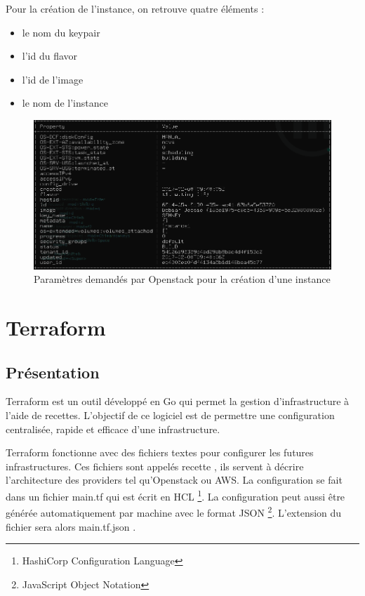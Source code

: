 \documentclass[]{article}
\begin{document}
Pour la création de l'instance, on retrouve quatre éléments : 
\begin{itemize}
\item le nom du keypair 
\item l'id du flavor 
\item l'id de l'image
\item le nom de l'instance
\end{itemize}
\vspace{5mm}
\begin{figure}
\centering
\includegraphics{Images/eeee.png}
\caption{Paramètres demandés par Openstack pour la création d'une instance}
\end{figure}

\newpage
\section{Terraform}\label{terraform}

\subsection{Présentation}\label{pruxe9senation}

Terraform est un outil développé en Go qui permet la gestion
d'infrastructure à l'aide de recettes. L'objectif de ce logiciel est de
permettre une configuration centralisée, rapide et efficace d'une
infrastructure.

Terraform fonctionne avec des fichiers textes pour configurer les futures
infrastructures. Ces fichiers sont appelés \og recette
\fg, ils servent à décrire l'architecture des providers tel
qu'Openstack ou AWS. La configuration se fait dans un fichier
\og main.tf \fg qui est écrit en HCL \footnote{HashiCorp Configuration Language}. La configuration peut aussi être
générée automatiquement par machine avec le format JSON \footnote{JavaScript Object Notation}.
L'extension du fichier sera alors \og main.tf.json
\fg.
\end{document}
